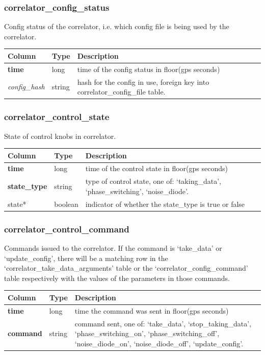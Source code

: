 \documentclass{article}
\begin{document}
{\subsubsection{correlator\_config\_status}
Config status of the correlator, i.e. which config file is being used by the correlator.
\begin{center}
 \begin{tabular}{| p{4cm} | p{2cm} | p{10cm} |}
\hline
 {\bf Column} & {\bf Type}  & {\bf Description} \\ [0.5ex]  \hline\hline
\textbf{time} & long & time of the config status in floor(gps seconds)\\ \hline
\textit{config\_hash} & string & hash for the config in use, foreign key into correlator\_config\_file table.\\ \hline
\end{tabular}
\end{center}


\subsubsection{correlator\_control\_state}
State of control knobs in correlator.
\begin{center}
 \begin{tabular}{| p{4cm} | p{2cm} | p{10cm} |}
\hline
 {\bf Column} & {\bf Type}  & {\bf Description} \\ [0.5ex]  \hline\hline
\textbf{time} & long & time of the control state in floor(gps seconds)\\ \hline
\textbf{state\_type} & string & type of control state, one of: `taking\_data', `phase\_switching',  `noise\_diode'.  \\ \hline
state* & boolean & indicator of whether the state\_type is true or false \\\hline
\end{tabular}
\end{center}

\subsubsection{correlator\_control\_command}
Commands issued to the correlator. If the command is `take\_data' or `update\_config', there will be a matching row in the `correlator\_take\_data\_arguments' table or the `correlator\_config\_command' table respectively with the values of the parameters in those commands.
\begin{center}
 \begin{tabular}{| p{4cm} | p{2cm} | p{10cm} |}
\hline
 {\bf Column} & {\bf Type}  & {\bf Description} \\ [0.5ex]  \hline\hline
\textbf{time} & long & time the command was sent in floor(gps seconds)\\ \hline
\textbf{command} & string & command sent, one of: `take\_data', `stop\_taking\_data',  `phase\_switching\_on',  `phase\_switching\_off',  `noise\_diode\_on',  `noise\_diode\_off',  `update\_config'.  \\ \hline
\end{tabular}
\end{center}

}
\end{document}
